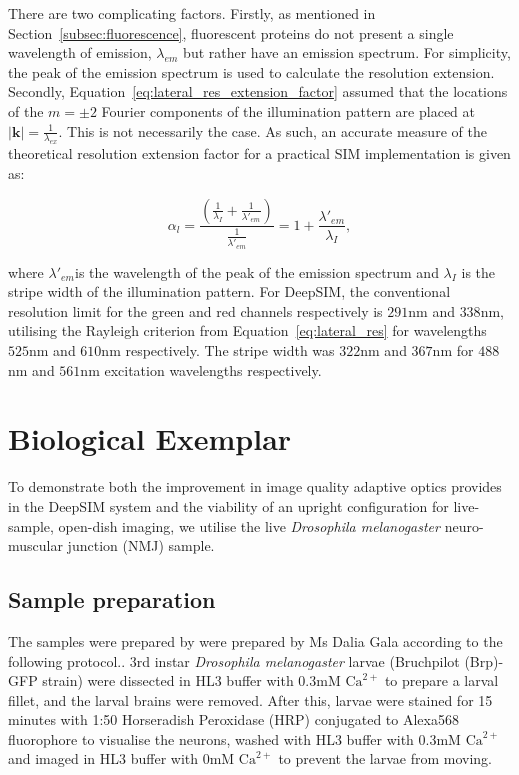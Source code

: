 There are two complicating factors. Firstly, as mentioned in 
Section~\ref{subsec:fluorescence}, fluorescent proteins do not present 
a single wavelength of emission, $\lambda_{em}$ but rather have an 
emission spectrum. For simplicity, the peak of the emission spectrum is
used to calculate the resolution extension. Secondly, 
Equation~\ref{eq:lateral_res_extension_factor} assumed that the locations
of the $m=\pm2$ Fourier components of the illumination pattern are placed
at $\left|\textbf{k}\right| = \frac{1}{\lambda_{ex}}$. This is not 
necessarily the case. As such, an accurate measure of the theoretical
resolution extension factor for a practical SIM implementation is given as:

\begin{equation}\label{eq:lateral_res_extension_factor_real}
\alpha_{l} = \frac{\left(\frac{1}{\lambda_{I}} + \frac{1}{\lambda'_{em}}\right)}{\frac{1}{\lambda'_{em}}} = 1 + \frac{\lambda'_{em}}{\lambda_{I}},
\end{equation}

where $\lambda'_{em}$is the wavelength of the peak of the emission 
spectrum and $\lambda_{I}$ is the stripe width of the illumination
pattern. For DeepSIM, the conventional resolution limit for the 
green and red channels respectively is $291$nm and $338$nm, 
utilising the Rayleigh criterion from Equation~\ref{eq:lateral_res} 
for wavelengths $525$nm and $610$nm respectively. The stripe width was $322$nm 
and $367$nm for $488$nm and $561$nm excitation wavelengths respectively.

\section{Biological Exemplar}
\label{sec:DeepSIM_biology}

To demonstrate both the improvement in image quality adaptive optics
provides in the DeepSIM system and the viability of an upright configuration 
for live-sample, open-dish imaging, we utilise the live \textit{Drosophila melanogaster} neuro-muscular junction (NMJ) sample.

\subsection{Sample preparation}
\label{subsec:DeepSIM_sample_prep}

The samples were prepared by were prepared by Ms Dalia Gala according to 
the following protocol.\cite{brent2009drosophila}. 3rd instar 
\textit{Drosophila melanogaster} larvae (Bruchpilot (Brp)-GFP strain) 
were dissected in HL3 
buffer with 0.3mM $\text{Ca}^{2+}$ to prepare a larval fillet,
and the larval brains were removed. After this, larvae were stained for 15 
minutes with 1:50 Horseradish Peroxidase (HRP) conjugated to Alexa568 
fluorophore to visualise the neurons, washed with HL3 buffer with 0.3mM 
$\text{Ca}^{2+}$ and imaged in HL3 buffer with 0mM $\text{Ca}^{2+}$ to 
prevent the larvae from moving.

